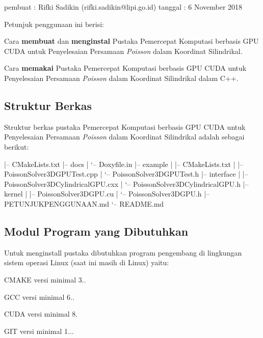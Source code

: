 
\begin{DoxyCode}
pembuat : Rifki Sadikin (rifki.sadikin@lipi.go.id)
tanggal : 6 November 2018
\end{DoxyCode}


Petunjuk penggunaan ini berisi\+:


\begin{DoxyItemize}
\item Cara {\bfseries membuat} dan {\bfseries menginstal} Pustaka Pemercepat Komputasi berbasis G\+PU C\+U\+DA untuk Penyelesaian Persamaan {\itshape Poisson} dalam Koordinat Silindrikal.
\item Cara {\bfseries memakai} Pustaka Pemercepat Komputasi berbasis G\+PU C\+U\+DA untuk Penyelesaian Persamaan {\itshape Poisson} dalam Koordinat Silindrikal dalam C++.
\end{DoxyItemize}

\subsection*{Struktur Berkas}

Struktur berkas pustaka Pemercepat Komputasi berbasis G\+PU C\+U\+DA untuk Penyelesaian Persamaan {\itshape Poisson} dalam Koordinat Silindrikal adalah sebagai berikut\+:


\begin{DoxyCode}
|-- CMakeLists.txt
|-- docs
|   `-- Doxyfile.in
|-- example
|   |-- CMakeLists.txt
|   |-- PoissonSolver3DGPUTest.cpp
|   `-- PoissonSolver3DGPUTest.h
|-- interface
|   |-- PoissonSolver3DCylindricalGPU.cxx
|   `-- PoissonSolver3DCylindricalGPU.h
|-- kernel
|   |-- PoissonSolver3DGPU.cu
|   `-- PoissonSolver3DGPU.h
|-- PETUNJUKPENGGUNAAN.md
`-- README.md
\end{DoxyCode}
 \subsection*{Modul Program yang Dibutuhkan}

Untuk menginstall pustaka dibutuhkan program pengembang di lingkungan sistem operasi Linux (saat ini masih di Linux) yaitu\+:


\begin{DoxyEnumerate}
\item C\+M\+A\+KE versi minimal 3..
\item G\+CC versi minimal 6..
\item C\+U\+DA versi minimal 8.
\item G\+IT versi minimal 1...
\end{DoxyEnumerate}

